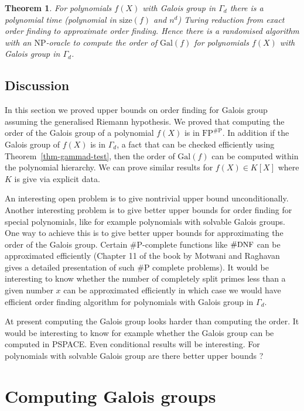 \documentclass[11pt]{madras}%
\newtheorem{theorem}{Theorem}[chapter]
\theoremstyle{remark}
\newcommand{\Gal}[1]{{\ensuremath{\mathrm{Gal}\left(#1\right)}}}
\newcommand{\size}[1]{{\ensuremath{\mathrm{size}\left(#1\right)}}}
\begin{document}
\begin{theorem}\label{thm-order-finding-gammad}
  For polynomials $f(X)$ with Galois group in $\Gamma_d$ there is a
  polynomial time (polynomial in $\size{f}$ and $n^d$) Turing
  reduction from exact order finding to approximate order finding.
  Hence there is a randomised algorithm with an $\mathrm{NP}$-oracle
  to compute the order of $\Gal{f}$ for polynomials $f(X)$ with Galois
  group in $\Gamma_d$.
\end{theorem}
    
\section{Discussion}

In this section we proved upper bounds on order finding for Galois
group assuming the generalised Riemann hypothesis. We proved that
computing the order of the Galois group of a polynomial $f(X)$ is in
$\mathrm{FP}^{\# \mathrm{P}}$. In addition if the Galois group of
$f(X)$ is in $\Gamma_d$, a fact that can be checked efficiently using
Theorem~\ref{thm-gammad-test}, then the order of $\Gal{f}$ can be
computed within the polynomial hierarchy.  We can prove similar
results for $f(X) \in K[X]$ where $K$ is give via explicit data.


An interesting open problem is to give nontrivial upper bound
unconditionally.  Another interesting problem is to give better upper
bounds for order finding for special polynomials, like for example
polynomials with solvable Galois groups. One way to achieve this is to
give better upper bounds for approximating the order of the Galois
group. Certain $\# \mathrm{P}$-complete functions like $\#
\textrm{{\small DNF}}$ can be approximated efficiently (Chapter 11 of
the book by Motwani and Raghavan~\cite{motwani97randomized} gives a
detailed presentation of such $\# \mathrm{P}$ complete problems). It
would be interesting to know whether the number of completely split
primes less than a given number $x$ can be approximated efficiently in
which case we would have efficient order finding algorithm for
polynomials with Galois group in $\Gamma_d$.

At present computing the Galois group looks harder than computing the
order. It would be interesting to know for example whether the Galois
group can be computed in PSPACE. Even conditional results will be
interesting.  For polynomials with solvable Galois group are there
better upper bounds ?


\chapter{Computing Galois groups}%
\label{chap-galois-special}
\end{document}
